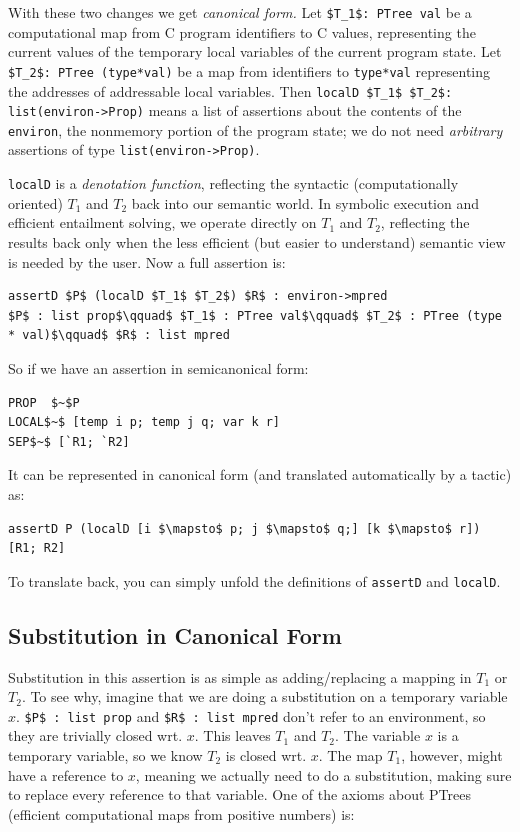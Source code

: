 \documentclass{puthesis}
\begin{document}
With these two changes we get \emph{canonical form.}  Let
\lstinline{$T_1$: PTree val} be a computational map from C program
identifiers to C values, representing the current values of the
temporary local variables of the current program state. Let
\lstinline{$T_2$: PTree (type*val)} be a map from identifiers to
\lstinline{type*val} representing the addresses of addressable local
variables.  Then \lstinline{localD $T_1$ $T_2$: list(environ->Prop)}
means a list of assertions about the contents of the
\lstinline{environ}, the nonmemory portion of the program state; we do
not need \emph{arbitrary} assertions of type
\lstinline{list(environ->Prop)}.

\lstinline{localD} is a \emph{denotation function}, reflecting the
syntactic (computationally oriented) $T_1$ and $T_2$ back into our
semantic world.  In symbolic execution and efficient entailment
solving, we operate directly on $T_1$ and $T_2$, reflecting the
results back only when the less efficient (but easier to understand)
semantic view is needed by the user. Now a full assertion is:

\begin{lstlisting}
assertD $P$ (localD $T_1$ $T_2$) $R$ : environ->mpred
$P$ : list prop$\qquad$ $T_1$ : PTree val$\qquad$ $T_2$ : PTree (type * val)$\qquad$ $R$ : list mpred
\end{lstlisting}

So if we have an assertion in semicanonical form:

\begin{lstlisting}
PROP  $~$P
LOCAL$~$ [temp i p; temp j q; var k r]
SEP$~$ [`R1; `R2]
\end{lstlisting}

It can be represented in canonical form (and translated automatically
by a tactic) as:

\begin{lstlisting}
assertD P (localD [i $\mapsto$ p; j $\mapsto$ q;] [k $\mapsto$ r]) [R1; R2]
\end{lstlisting}

To translate back, you can simply unfold the definitions of \lstinline|assertD|
and \lstinline|localD|.

\subsection{Substitution in Canonical Form}
\label{subst_canon}
Substitution in this assertion is as simple as adding/replacing a
mapping in $T_1$ or $T_2$. To see why, imagine that we are doing a
substitution on a temporary variable $x$.  \lstinline|$P$ : list prop|
and \lstinline|$R$ : list mpred| don't refer to an environment, so
they are trivially closed wrt.  $x$. This leaves $T_1$ and $T_2$. The
variable $x$ is a temporary variable, so we know $T_2$ is closed
wrt. $x$.  The map $T_1$, however, might have a reference to $x$,
meaning we actually need to do a substitution, making sure to replace
every reference to that variable. One of the axioms about PTrees
(efficient computational maps from positive numbers) is:
\end{document}
